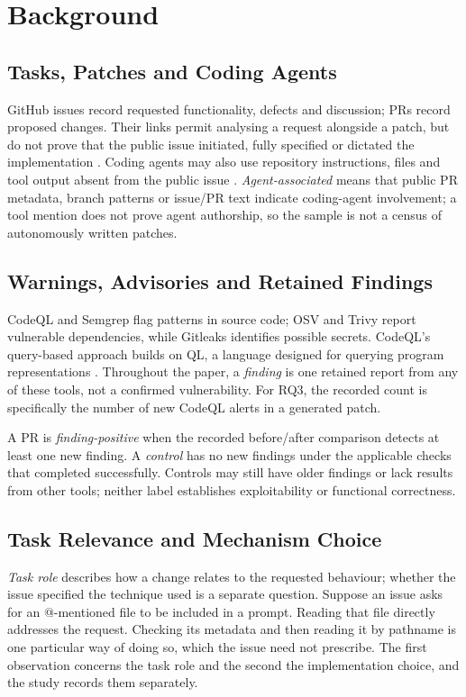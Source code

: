 \documentclass[acmsmall,screen,nonacm]{acmart}
\begin{document}
\section{Background}

\subsection{Tasks, Patches and Coding Agents}

GitHub issues record requested functionality, defects and discussion; PRs record proposed changes. Their links permit analysing a request alongside a patch, but do not prove that the public issue initiated, fully specified or dictated the implementation \cite{b5}. Coding agents may also use repository instructions, files and tool output absent from the public issue \cite{b20,b22}. \emph{Agent-associated} means that public PR metadata, branch patterns or issue/PR text indicate coding-agent involvement; a tool mention does not prove agent authorship, so the sample is not a census of autonomously written patches.

\subsection{Warnings, Advisories and Retained Findings}

CodeQL and Semgrep flag patterns in source code; OSV and Trivy report vulnerable dependencies, while Gitleaks identifies possible secrets. CodeQL's query-based approach builds on QL, a language designed for querying program representations \cite{b44}. Throughout the paper, a \emph{finding} is one retained report from any of these tools, not a confirmed vulnerability. For RQ3, the recorded count is specifically the number of new CodeQL alerts in a generated patch.

A PR is \emph{finding-positive} when the recorded before/after comparison detects at least one new finding. A \emph{control} has no new findings under the applicable checks that completed successfully. Controls may still have older findings or lack results from other tools; neither label establishes exploitability or functional correctness.

\subsection{Task Relevance and Mechanism Choice}

\emph{Task role} describes how a change relates to the requested behaviour; whether the issue specified the technique used is a separate question. Suppose an issue asks for an @-mentioned file to be included in a prompt. Reading that file directly addresses the request. Checking its metadata and then reading it by pathname is one particular way of doing so, which the issue need not prescribe. The first observation concerns the task role and the second the implementation choice, and the study records them separately.
\end{document}
